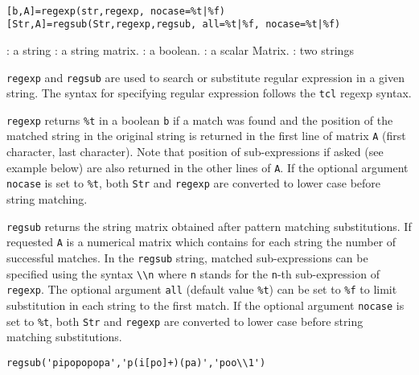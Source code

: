 
\begin{mandesc}
   \\
\end{mandesc}
\begin{calling_sequence}
\begin{verbatim}
[b,A]=regexp(str,regexp, nocase=%t|%f)
[Str,A]=regsub(Str,regexp,regsub, all=%t|%f, nocase=%t|%f)
\end{verbatim}
\end{calling_sequence}

\begin{parameters}
  \begin{varlist}
     : a string
     : a string matrix.
    :  a boolean.
    :  a scalar Matrix.
    : two strings
  \end{varlist}
\end{parameters}

\begin{mandescription}
\noindent \verb+regexp+ and \verb+regsub+ are used to search or substitute regular expression
in a given string. The syntax for specifying regular expression follows the \verb+tcl+ 
regexp syntax.

\verb+regexp+ returns \verb+%t+ in a boolean \verb+b+ if a match was found and the 
position of the matched string in the original string is returned in 
the first line of matrix \verb+A+ (first character, last character). 
Note that position of sub-expressions if asked (see example below) 
are also returned in the other lines of \verb+A+. If the optional argument \verb+nocase+ 
is set to \verb+%t+, both \verb+Str+ and \verb+regexp+ are converted to lower case before string matching.

\verb+regsub+ returns the string matrix obtained after pattern matching substitutions. 
If requested \verb+A+ is a numerical matrix which contains for each string the number of successful matches. 
In the \verb+regsub+ string, matched sub-expressions can be specified using the 
syntax \verb+\\n+ where \verb+n+ stands for the \verb+n+-th sub-expression of 
\verb+regexp+. The optional argument \verb+all+ (default value \verb+%t+) can be set to 
\verb+%f+ to limit substitution in each string to the first match. If the optional argument \verb+nocase+ 
is set to \verb+%t+, both \verb+Str+ and \verb+regexp+ are converted to lower case before string matching 
substitutions. 

\end{mandescription}

\begin{examples}
  \begin{program}
    \verb!regsub('pipopopopa','p(i[po]+)(pa)','poo\\1')! 
  \end{program}
\end{examples}


